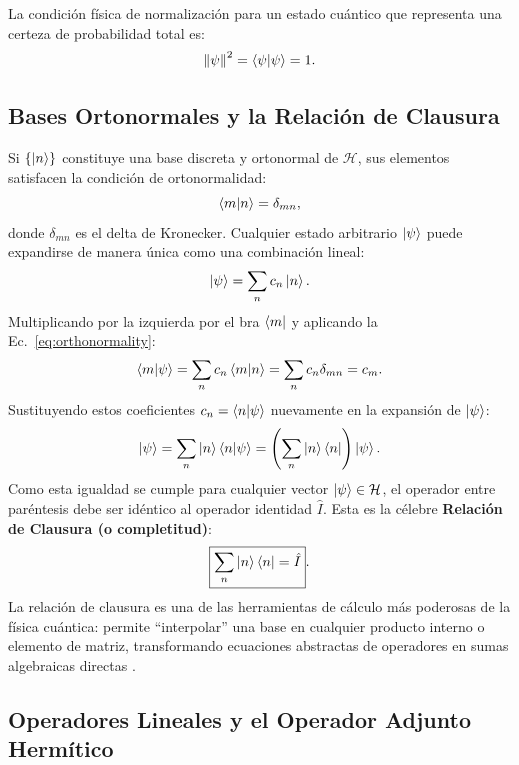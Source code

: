 La condición física de normalización para un estado cuántico que representa una certeza de probabilidad total es:
\begin{equation}
    \left\| \psi \right\|^2 = \left\langle \psi \middle| \psi \right\rangle = 1.
\end{equation}

\subsection{Bases Ortonormales y la Relación de Clausura}

Si $\{\left| n \right\rangle\}$ constituye una base discreta y ortonormal de $\mathcal{H}$, sus elementos satisfacen la condición de ortonormalidad:
\begin{equation}
    \left\langle m \middle| n \right\rangle = \delta_{mn},
    \label{eq:orthonormality}
\end{equation}
donde $\delta_{mn}$ es el delta de Kronecker. Cualquier estado arbitrario $\left| \psi \right\rangle$ puede expandirse de manera única como una combinación lineal:
\begin{equation}
    \left| \psi \right\rangle = \sum_n c_n \left| n \right\rangle.
\end{equation}
Multiplicando por la izquierda por el bra $\left\langle m \right|$ y aplicando la Ec.~\eqref{eq:orthonormality}:
\begin{equation}
    \left\langle m \middle| \psi \right\rangle = \sum_n c_n \left\langle m \middle| n \right\rangle = \sum_n c_n \delta_{mn} = c_m.
\end{equation}
Sustituyendo estos coeficientes $c_n = \left\langle n \middle| \psi \right\rangle$ nuevamente en la expansión de $\left| \psi \right\rangle$:
\begin{equation}
    \left| \psi \right\rangle = \sum_n \left| n \right\rangle\left\langle n \middle| \psi \right\rangle = \left( \sum_n \left| n \right\rangle\left\langle n \right| \right) \left| \psi \right\rangle.
\end{equation}
Como esta igualdad se cumple para cualquier vector $\left| \psi \right\rangle \in \mathcal{H}$, el operador entre paréntesis debe ser idéntico al operador identidad $\hat{I}$. Esta es la célebre \textbf{Relación de Clausura (o completitud)}:
\begin{equation}
    \boxed{\sum_n \left| n \right\rangle\left\langle n \right| = \hat{I}}.
    \label{eq:closure_relation}
\end{equation}
La relación de clausura es una de las herramientas de cálculo más poderosas de la física cuántica: permite \enquote{interpolar} una base en cualquier producto interno o elemento de matriz, transformando ecuaciones abstractas de operadores en sumas algebraicas directas \cite{zettili}.

\subsection{Operadores Lineales y el Operador Adjunto Hermítico}

